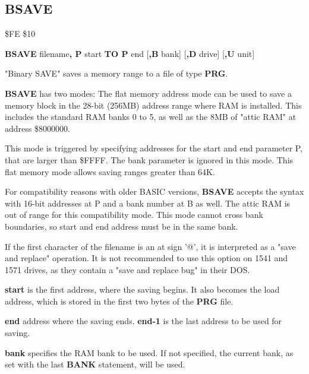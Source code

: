 \newpage
\subsection{BSAVE}
\begin{description}[leftmargin=2cm,style=nextline]
\item [Token:] \$FE \$10
\item [Format:] {\bf BSAVE} filename{\bf, P} start {\bf TO P} end
                [{\bf,B} bank] [{\bf,D} drive] [{\bf,U} unit]
\item [Usage:]
   "Binary SAVE" saves a memory range to a file of type {\bf PRG}.

   {\bf BSAVE} has two modes:
   The flat memory address mode can be used to save a memory block
   in the 28-bit (256MB) address range where RAM is installed.
   This includes the standard RAM banks 0 to 5, as well as
   the 8MB of "attic RAM" at address \$8000000.

   This mode is triggered by specifying addresses for the start
   and end parameter P, that are
   larger than \$FFFF. The bank parameter is ignored in this mode.
   This flat memory mode allows saving ranges greater than 64K.

   For compatibility reasons with older BASIC versions, {\bf BSAVE}
   accepts the syntax with 16-bit addresses at P and a bank number at B as well.
   The attic RAM is out of range for this compatibility mode.
   This mode cannot cross bank boundaries, so start and end address
   must be in the same bank.


   \filenamedefinition
   If the first character of the filename is an at sign '@', it
   is interpreted as a "save and replace" operation. It is not recommended
   to use this option on 1541 and 1571 drives, as they
   contain a "save and replace bug" in their DOS.

    {\bf start} is the first address, where the saving begins.
    It also becomes the load address,
    which is stored in the first two bytes of the {\bf PRG} file.

   {\bf end} address where the saving ends.
   {\bf end-1} is the last address to be used for saving.

   {\bf bank} specifies the RAM bank to be used.
   If not specified, the current bank, as set with the last
   {\bf BANK} statement, will be used.

   \drivedefinition

   \unitdefinition


\end{description}
